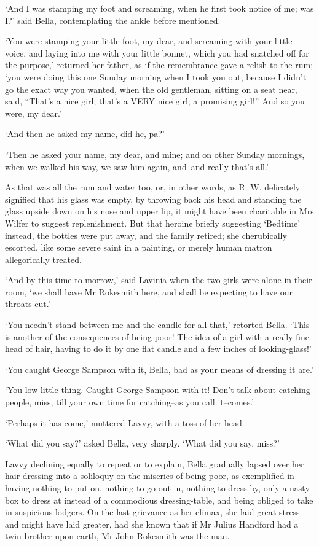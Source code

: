 ‘And I was stamping my foot and screaming, when he first took notice of
me; was I?’ said Bella, contemplating the ankle before mentioned.

‘You were stamping your little foot, my dear, and screaming with your
little voice, and laying into me with your little bonnet, which you
had snatched off for the purpose,’ returned her father, as if the
remembrance gave a relish to the rum; ‘you were doing this one Sunday
morning when I took you out, because I didn’t go the exact way you
wanted, when the old gentleman, sitting on a seat near, said, “That’s a
nice girl; that’s a VERY nice girl; a promising girl!” And so you were,
my dear.’

‘And then he asked my name, did he, pa?’

‘Then he asked your name, my dear, and mine; and on other Sunday
mornings, when we walked his way, we saw him again, and--and really
that’s all.’

As that was all the rum and water too, or, in other words, as R. W.
delicately signified that his glass was empty, by throwing back his head
and standing the glass upside down on his nose and upper lip, it might
have been charitable in Mrs Wilfer to suggest replenishment. But that
heroine briefly suggesting ‘Bedtime’ instead, the bottles were put away,
and the family retired; she cherubically escorted, like some severe
saint in a painting, or merely human matron allegorically treated.

‘And by this time to-morrow,’ said Lavinia when the two girls were alone
in their room, ‘we shall have Mr Rokesmith here, and shall be expecting
to have our throats cut.’

‘You needn’t stand between me and the candle for all that,’ retorted
Bella. ‘This is another of the consequences of being poor! The idea of a
girl with a really fine head of hair, having to do it by one flat candle
and a few inches of looking-glass!’

‘You caught George Sampson with it, Bella, bad as your means of dressing
it are.’

‘You low little thing. Caught George Sampson with it! Don’t talk about
catching people, miss, till your own time for catching--as you call
it--comes.’

‘Perhaps it has come,’ muttered Lavvy, with a toss of her head.

‘What did you say?’ asked Bella, very sharply. ‘What did you say, miss?’

Lavvy declining equally to repeat or to explain, Bella gradually lapsed
over her hair-dressing into a soliloquy on the miseries of being poor,
as exemplified in having nothing to put on, nothing to go out in,
nothing to dress by, only a nasty box to dress at instead of a
commodious dressing-table, and being obliged to take in suspicious
lodgers. On the last grievance as her climax, she laid great stress--and
might have laid greater, had she known that if Mr Julius Handford had a
twin brother upon earth, Mr John Rokesmith was the man.


